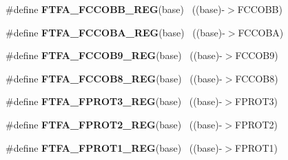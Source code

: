 \begin{DoxyCompactItemize}
\item 
\hypertarget{group___f_t_f_a___register___accessor___macros_ga5f79719251a91c46a0580e66de88cb4e}{}\#define {\bfseries F\+T\+F\+A\+\_\+\+F\+C\+C\+O\+B\+B\+\_\+\+R\+E\+G}(base)                                    ~((base)-\/$>$F\+C\+C\+O\+B\+B)\label{group___f_t_f_a___register___accessor___macros_ga5f79719251a91c46a0580e66de88cb4e}

\item 
\hypertarget{group___f_t_f_a___register___accessor___macros_ga536ccf6bf31e3ff5580f663e45dcaa81}{}\#define {\bfseries F\+T\+F\+A\+\_\+\+F\+C\+C\+O\+B\+A\+\_\+\+R\+E\+G}(base)                                    ~((base)-\/$>$F\+C\+C\+O\+B\+A)\label{group___f_t_f_a___register___accessor___macros_ga536ccf6bf31e3ff5580f663e45dcaa81}

\item 
\hypertarget{group___f_t_f_a___register___accessor___macros_gafd2b7a5168a9fcb50d59eb3594537287}{}\#define {\bfseries F\+T\+F\+A\+\_\+\+F\+C\+C\+O\+B9\+\_\+\+R\+E\+G}(base)                                    ~((base)-\/$>$F\+C\+C\+O\+B9)\label{group___f_t_f_a___register___accessor___macros_gafd2b7a5168a9fcb50d59eb3594537287}

\item 
\hypertarget{group___f_t_f_a___register___accessor___macros_ga19663a48847b0be87b4777ea8f924920}{}\#define {\bfseries F\+T\+F\+A\+\_\+\+F\+C\+C\+O\+B8\+\_\+\+R\+E\+G}(base)                                    ~((base)-\/$>$F\+C\+C\+O\+B8)\label{group___f_t_f_a___register___accessor___macros_ga19663a48847b0be87b4777ea8f924920}

\item 
\hypertarget{group___f_t_f_a___register___accessor___macros_gac6f1f2c459468aeb404a9eba46d54c5e}{}\#define {\bfseries F\+T\+F\+A\+\_\+\+F\+P\+R\+O\+T3\+\_\+\+R\+E\+G}(base)                                    ~((base)-\/$>$F\+P\+R\+O\+T3)\label{group___f_t_f_a___register___accessor___macros_gac6f1f2c459468aeb404a9eba46d54c5e}

\item 
\hypertarget{group___f_t_f_a___register___accessor___macros_ga35897dbfbff1d92db497e4c553692eda}{}\#define {\bfseries F\+T\+F\+A\+\_\+\+F\+P\+R\+O\+T2\+\_\+\+R\+E\+G}(base)                                    ~((base)-\/$>$F\+P\+R\+O\+T2)\label{group___f_t_f_a___register___accessor___macros_ga35897dbfbff1d92db497e4c553692eda}

\item 
\hypertarget{group___f_t_f_a___register___accessor___macros_gad0a42e1dffbcc9f89f85c147c728fd3e}{}\#define {\bfseries F\+T\+F\+A\+\_\+\+F\+P\+R\+O\+T1\+\_\+\+R\+E\+G}(base)                                    ~((base)-\/$>$F\+P\+R\+O\+T1)\label{group___f_t_f_a___register___accessor___macros_gad0a42e1dffbcc9f89f85c147c728fd3e}


\end{DoxyCompactItemize}
